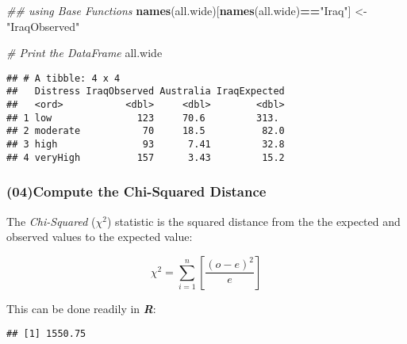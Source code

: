 \documentclass[
]{article}
\newenvironment{Shaded}{\begin{snugshade}}{\end{snugshade}}
\newcommand{\CommentTok}[1]{\textcolor[rgb]{0.56,0.35,0.01}{\textit{#1}}}
\newcommand{\DecValTok}[1]{\textcolor[rgb]{0.00,0.00,0.81}{#1}}
\newcommand{\KeywordTok}[1]{\textcolor[rgb]{0.13,0.29,0.53}{\textbf{#1}}}
\newcommand{\NormalTok}[1]{#1}
\newcommand{\OperatorTok}[1]{\textcolor[rgb]{0.81,0.36,0.00}{\textbf{#1}}}
\newcommand{\StringTok}[1]{\textcolor[rgb]{0.31,0.60,0.02}{#1}}
\begin{document}
\begin{Shaded}
\begin{Highlighting}[]
\CommentTok{\#\# using Base Functions}
\KeywordTok{names}\NormalTok{(all.wide)[}\KeywordTok{names}\NormalTok{(all.wide)}\OperatorTok{==}\StringTok{"Iraq"}\NormalTok{] <{-}}\StringTok{ "IraqObserved"}

\CommentTok{\# Print the DataFrame}
\NormalTok{all.wide}
\end{Highlighting}
\end{Shaded}

\begin{verbatim}
## # A tibble: 4 x 4
##   Distress IraqObserved Australia IraqExpected
##   <ord>           <dbl>     <dbl>        <dbl>
## 1 low               123     70.6         313. 
## 2 moderate           70     18.5          82.0
## 3 high               93      7.41         32.8
## 4 veryHigh          157      3.43         15.2
\end{verbatim}

\hypertarget{compute-the-chi-squared-distance}{%
\subsubsection{(04)Compute the Chi-Squared
Distance}\label{compute-the-chi-squared-distance}}

The \emph{Chi-Squared} (\(\chi^2\)) statistic is the squared distance
from the the expected and observed values to the expected value:

\[
\chi^2 = \sum^n_{i=1} \left[ \frac{(o-e)^2}{e} \right]
\]

This can be done readily in \textbf{\emph{R}}:

\begin{Shaded}
\end{Shaded}

\begin{verbatim}
## [1] 1550.75
\end{verbatim}
\end{document}
